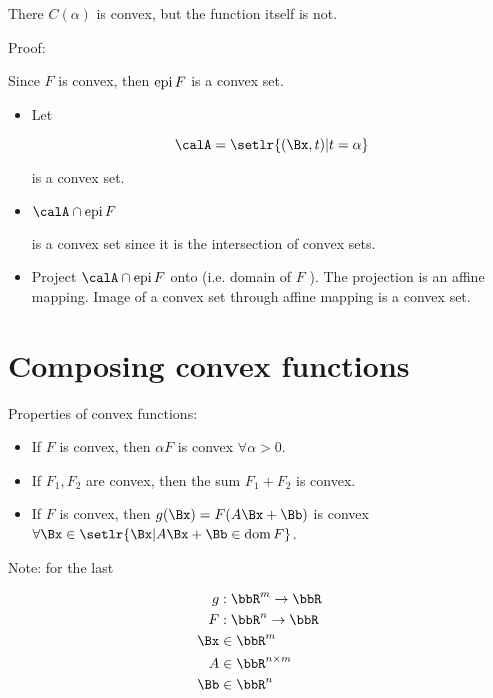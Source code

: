 There \( C(\alpha) \) is convex, but the function itself is not.

Proof:

Since \( F \) is convex, then \( \operatorname{epi} F \) is a convex set.

\begin{itemize}
\item
Let

\begin{equation}\label{eqn:convexOptimizationLecture5:580}
\calA = \setlr{ (\Bx,t) | t = \alpha }
\end{equation}

is a convex set.

\item
\( \calA \cap \epi F \)

is a convex set since it is the intersection of convex sets.

\item Project \( \calA \cap \epi F \) onto  (i.e. domain of \( F \) ).  The projection is an affine mapping.  Image of a convex set through affine mapping is a convex set.
\end{itemize}


\section{Composing convex functions}

Properties of convex functions:

\begin{itemize}
\item If \( F \) is convex, then \( \alpha F \) is convex \( \forall \alpha > 0 \).
\item If \( F_1, F_2 \) are convex, then the sum \( F_1 + F_2 \) is convex.
\item If \( F \) is convex, then \( g(\Bx) = F(A \Bx + \Bb) \) is convex \( \forall \Bx \in \setlr{ \Bx | A \Bx + \Bb \in \dom F } \).
\end{itemize}

Note: for the last

\begin{equation}\label{eqn:convexOptimizationLecture5:620}
\begin{aligned}
g &: \bbR^m \rightarrow \bbR  \\
F &: \bbR^n \rightarrow \bbR  \\
\Bx &\in \bbR^m \\
A &\in \bbR^{n \times m} \\
\Bb &\in \bbR^n
\end{aligned}
\end{equation}

